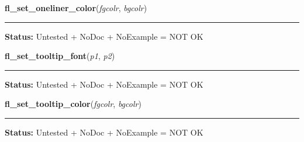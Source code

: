     \label{xformslib:library:fl_set_oneliner_color}

    \vspace{0.5ex}

\hspace{.8\funcindent}\begin{boxedminipage}{\funcwidth}

    \raggedright \textbf{fl\_set\_oneliner\_color}(\textit{fgcolr}, \textit{bgcolr})

    \vspace{-1.5ex}

    \rule{\textwidth}{0.5\fboxrule}
\setlength{\parskip}{2ex}
\setlength{\parskip}{1ex}
\textbf{Status:} Untested + NoDoc + NoExample = NOT OK



    \end{boxedminipage}

    \label{xformslib:library:fl_set_tooltip_font}

    \vspace{0.5ex}

\hspace{.8\funcindent}\begin{boxedminipage}{\funcwidth}

    \raggedright \textbf{fl\_set\_tooltip\_font}(\textit{p1}, \textit{p2})

    \vspace{-1.5ex}

    \rule{\textwidth}{0.5\fboxrule}
\setlength{\parskip}{2ex}
\setlength{\parskip}{1ex}
\textbf{Status:} Untested + NoDoc + NoExample = NOT OK



    \end{boxedminipage}

    \label{xformslib:library:fl_set_tooltip_color}

    \vspace{0.5ex}

\hspace{.8\funcindent}\begin{boxedminipage}{\funcwidth}

    \raggedright \textbf{fl\_set\_tooltip\_color}(\textit{fgcolr}, \textit{bgcolr})

    \vspace{-1.5ex}

    \rule{\textwidth}{0.5\fboxrule}
\setlength{\parskip}{2ex}
\setlength{\parskip}{1ex}
\textbf{Status:} Untested + NoDoc + NoExample = NOT OK



    \end{boxedminipage}

